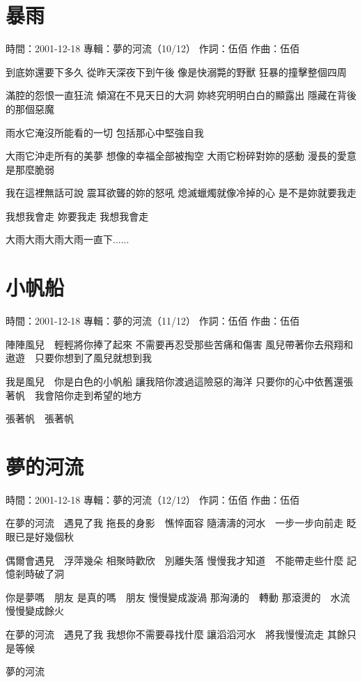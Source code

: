 \documentclass[UTF8,a4paper,oneside,twocolumn,12pt]{ctexbook}
\newcommand{\infopair}[2]{\textbullet #1：#2}
\newcommand{\zc}[1][伍佰]{\infopair{作詞}{#1}}
\newcommand{\zq}[1][伍佰]{\infopair{作曲}{#1}}
\newcommand{\zj}[1]{\infopair{專輯}{#1}}
\newcommand{\sj}[1]{\infopair{時間}{#1}}
\newenvironment{info}{\begin{flushleft}\kaishu
	}
	{\end{flushleft}\normalsize\yahei\par}
\newenvironment{lyric}{
	}
{}
\begin{document}
\section{暴雨}
\begin{info}
	\sj{2001-12-18}
	\zj{夢的河流（10/12）}
	\zc
	\zq
\end{info}
\begin{lyric}
	到底妳還要下多久
	從昨天深夜下到午後
	像是快溺斃的野獸
	狂暴的撞擊整個四周

	滿腔的怨恨一直狂流
	傾瀉在不見天日的大洞
	妳終究明明白白的顯露出
	隱藏在背後的那個惡魔

	雨水它淹沒所能看的一切
	包括那心中堅強自我

	大雨它沖走所有的美夢
	想像的幸福全部被掏空
	大雨它粉碎對妳的感動
	漫長的愛意是那麼脆弱

	我在這裡無話可說
	震耳欲聾的妳的怒吼
	熄滅蠟燭就像冷掉的心
	是不是妳就要我走

	我想我會走
	妳要我走
	我想我會走

	大雨大雨大雨大雨一直下......
\end{lyric}

\section{小帆船}
\begin{info}
	\sj{2001-12-18}
	\zj{夢的河流（11/12）}
	\zc
	\zq
\end{info}
\begin{lyric}
	陣陣風兒　輕輕將你捧了起來
	不需要再忍受那些苦痛和傷害
	風兒帶著你去飛翔和遨遊　只要你想到了風兒就想到我

	我是風兒　你是白色的小帆船
	讓我陪你渡過這險惡的海洋
	只要你的心中依舊還張著帆　我會陪你走到希望的地方

	張著帆　張著帆
\end{lyric}

\section{夢的河流}
\begin{info}
	\sj{2001-12-18}
	\zj{夢的河流（12/12）}
	\zc
	\zq
\end{info}
\begin{lyric}
	在夢的河流　遇見了我
	拖長的身影　憔悴面容
	隨濤濤的河水　一步一步向前走
	眨眼已是好幾個秋

	偶爾會遇見　浮萍幾朵
	相聚時歡欣　別離失落
	慢慢我才知道　不能帶走些什麼
	記憶剎時破了洞

	你是夢嗎　朋友
	是真的嗎　朋友
	慢慢變成漩渦
	那洶湧的　轉動
	那滾燙的　水流
	慢慢變成餘火

	在夢的河流　遇見了我
	我想你不需要尋找什麼
	讓滔滔河水　將我慢慢流走
	其餘只是等候

	夢的河流
\end{lyric}
\end{document}
